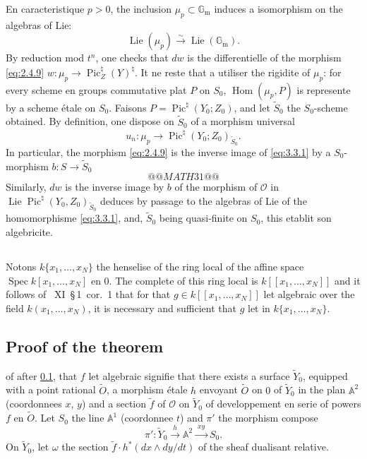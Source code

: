 \documentclass[12pt,a4paper]{article}
\theoremstyle{plain}
\theoremstyle{definition}
\theoremstyle{remark}
\DeclareMathOperator{\Spec}{Spec}
\DeclareMathOperator{\Lie}{Lie}
\DeclareMathOperator{\Pic}{Pic}
\DeclareMathOperator{\Hom}{Hom}
\newcommand{\OO}{\mathcal{O}}
\newcommand{\Gm}{\mathbb{G}_{\mathrm{m}}}
\newcommand{\mup}{\mu_{p}}
\providecommand{\AA}{\mathbb{A}}
\providecommand{\Gm}{\mathbb{G}_{\mathrm m}}
\providecommand{\Hom}{\operatorname{Hom}}
\providecommand{\Spec}{\operatorname{Spec}}
\providecommand{\mup}{\mu_p}
\providecommand{\Lie}{\operatorname{Lie}}
\begin{document}
En caracteristique $p>0$, the inclusion $\mup\subset\Gm$ induces a isomorphism on the
algebras of Lie:
\[
\Lie(\mup)\xrightarrow{\sim}\Lie(\Gm).
\]
By reduction mod $t^n$, one checks that $dw$ is the differentielle of the morphism
\eqref{eq:2.4.9} $w:\mup\to\Pic_Z^\natural(Y)^\natural$. It ne reste that a utiliser the rigidite of
$\mup$: for every scheme en groups commutative plat $P$ on $S_0$, $\Hom(\mup,P)$ is
represente by a scheme étale on $S_0$. Faisons $P=\Pic^\natural(Y_0;Z_0)$, and let
$\widetilde{S}_0$ the $S_0$-scheme obtained. By definition, one dispose on $\widetilde{S}_0$ of a morphism universal
\begin{equation}\label{eq:3.3.1}
u_n:\mup\to\Pic^\natural(Y_0;Z_0)_{\widetilde{S}_0}.
\end{equation}
In particular, the morphism \eqref{eq:2.4.9} is the inverse image of \eqref{eq:3.3.1} by a $S_0$-
morphism $b:S\to\widetilde{S}_0$
\[
@@MATH31@@
\]
Similarly, $dw$ is the inverse image by $b$ of the morphism of $\OO$ in
$\Lie\Pic^\natural(Y_0,Z_0)_{\widetilde{S}_0}$ deduces by passage to the algebras of Lie of the homomorphisme
\eqref{eq:3.3.1}, and, $\widetilde{S}_0$ being quasi-finite on $S_0$, this etablit son algebricite.

\subsection{}\label{sec:3.4}

Notons $k\{x_1,\dots,x_N\}$ the henselise of the ring local of the affine space
$\Spec k[x_1,\dots,x_N]$ en $0$. The complete of this ring local is $k[[x_1,\dots,x_N]]$
and it follows of \cite{Raynaud2}~XI~\S\,1~cor.~1 that for that
$g\in k[[x_1,\dots,x_N]]$ let algebraic over the field $k(x_1,\dots,x_N)$, it is necessary and sufficient that $g$ let in $k\{x_1,\dots,x_N\}$.

\subsection{Proof of the theorem}\label{sec:3.5}

of after \ref{sec:3.4}, that $f$ let algebraic signifie that there exists a surface
$\widetilde{Y}_0$, equipped with a point rational $\widetilde{O}$, a morphism étale $h$ envoyant
$\widetilde{O}$ on $0$ of $\widetilde{Y}_0$ in the plan $\AA^2$ (coordonnees $x$, $y$) and a section
$\tilde{f}$ of $\OO$ on $\widetilde{Y}_0$ of developpement en serie of powers $f$ en $\widetilde{O}$.
Let $S_0$ the line $\AA^1$ (coordonnee $t$) and $\pi'$ the morphism compose
\[
\pi':\widetilde{Y}_0\xrightarrow{\;h\;}\AA^2\xrightarrow{\;xy\;}S_0.
\]
On $\widetilde{Y}_0$, let $\omega$ the section $\tilde{f}\cdot h^*(dx\wedge dy/dt)$ of the sheaf dualisant relative.
\end{document}

